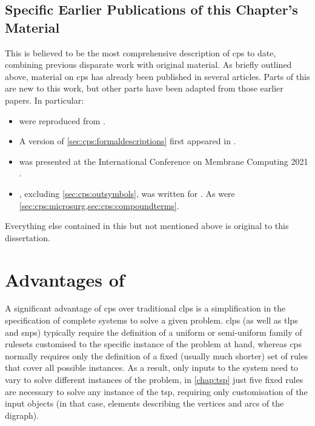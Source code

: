 \subsection{Specific Earlier Publications of this Chapter's Material}
This  is believed to be the most comprehensive description of \gls{cps} to date, combining previous disparate work with original material.  As briefly outlined above, material on \gls{cps} has already been published in several articles.  Parts of this  are new to this work, but other parts have been adapted from those earlier papers.  In particular:
\begin{itemize}
    \item {} were reproduced from \cite{Cooper2019}.
    \item A version of \cref{sec:cps:formaldescriptions} first appeared in \cite{Cooper2019a}.
    \item {} was presented at the International Conference on Membrane Computing 2021 \cite{Cooper2021a}.
    \item {}, excluding \cref{sec:cps:outsymbols}, was written for \cite{Cooper2022}.  As were \cref{sec:cps:microsurg,sec:cps:compoundterms}.
\end{itemize}

Everything else contained in this  but not mentioned above is original to this dissertation.


\section{Advantages of }
A significant advantage of \gls{cps} over traditional \gls{clps} is a simplification in the specification of complete systems to solve a given problem.  \Gls{clps} (as well as \gls{tlps} and \gls{snps}) typically require the definition of a uniform or semi-uniform family of \glspl{ruleset} customised to the specific instance of the problem at hand, whereas \gls{cps} normally requires only the definition of a fixed (usually much shorter) set of rules that cover all possible instances. As a result, only inputs to the system need to vary to solve different instances of the problem, \eg{} in \cref{chap:tsp} just five fixed rules are necessary to solve any instance of the \gls{tsp}, requiring only customisation of the input objects (in that case, elements describing the vertices and arcs of the digraph).

